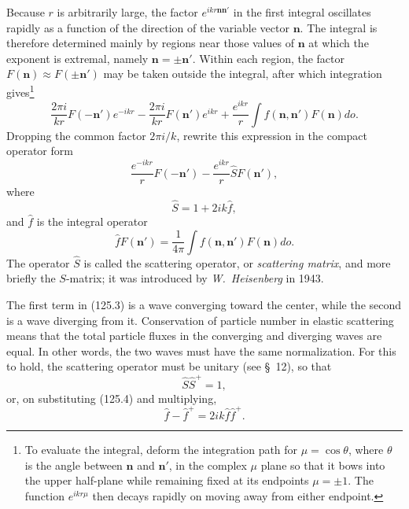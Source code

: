 Because $r$ is arbitrarily large, the factor $e^{ikr\mathbf n\mathbf n'}$ in the first integral oscillates rapidly as a function of the direction of the variable vector $\mathbf n$. The integral is therefore determined mainly by regions near those values of $\mathbf n$ at which the exponent is extremal, namely $\mathbf n=\pm\mathbf n'$. Within each region, the factor $F(\mathbf n)\approx F(\pm\mathbf n')$ may be taken outside the integral, after which integration gives\footnote{To evaluate the integral, deform the integration path for $\mu=\cos\theta$, where $\theta$ is the angle between $\mathbf n$ and $\mathbf n'$, in the complex $\mu$ plane so that it bows into the upper half-plane while remaining fixed at its endpoints $\mu=\pm1$. The function $e^{ikr\mu}$ then decays rapidly on moving away from either endpoint.}
\[
 \frac{2\pi i}{kr}F(-\mathbf n')e^{-ikr}
 -\frac{2\pi i}{kr}F(\mathbf n')e^{ikr}
 +\frac{e^{ikr}}r\int f(\mathbf n,\mathbf n')F(\mathbf n)do.
\]
Dropping the common factor $2\pi i/k$, rewrite this expression in the compact operator form
\begin{equation}
 \frac{e^{-ikr}}rF(-\mathbf n')-\frac{e^{ikr}}r\hat S F(\mathbf n'),
 \tag{125.3}
\end{equation}
where
\begin{equation}
 \hat S=1+2ik\hat f,
 \tag{125.4}
\end{equation}
and $\hat f$ is the integral operator
\begin{equation}
 \hat fF(\mathbf n')=\frac1{4\pi}\int
 f(\mathbf n,\mathbf n')F(\mathbf n)do.
 \tag{125.5}
\end{equation}
The operator $\hat S$ is called the scattering operator, or \emph{scattering matrix}, and more briefly the $S$-matrix; it was introduced by \emph{W.~Heisenberg} in 1943.

The first term in (125.3) is a wave converging toward the center, while the second is a wave diverging from it. Conservation of particle number in elastic scattering means that the total particle fluxes in the converging and diverging waves are equal. In other words, the two waves must have the same normalization. For this to hold, the scattering operator must be unitary (see §~12), so that
\begin{equation}
 \hat S\hat S^+=1,
 \tag{125.6}
\end{equation}
or, on substituting (125.4) and multiplying,
\begin{equation}
 \hat f-\hat f^+=2ik\hat f\hat f^+.
 \tag{125.7}
\end{equation}

